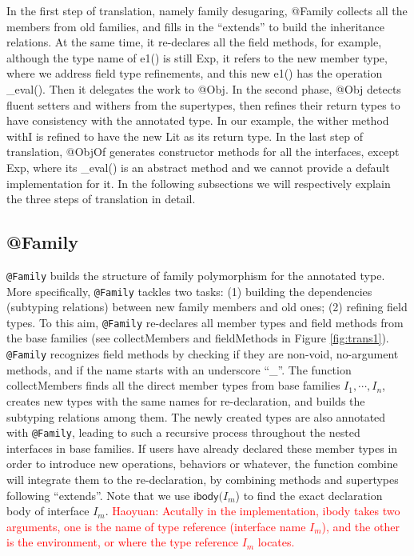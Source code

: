 In the first step of translation, namely family desugaring, \textsf{@Family} collects all the members from old families, and fills in the ``extends'' to build the inheritance relations. At the same time, it re-declares all the field methods, for example, although the type name of \textsf{e1()} is still \textsf{Exp}, it refers to the new member type, where we address field type refinements, and this new \textsf{e1()} has the operation \textsf{\_eval()}. Then it delegates the work to \textsf{@Obj}. In the second phase, \textsf{@Obj} detects fluent setters and withers from the supertypes, then refines their return types to have consistency with the annotated type. In our example, the wither method \textsf{withI} is refined to have the new \textsf{Lit} as its return type. In the last step of translation, \textsf{@ObjOf} generates constructor methods for all the interfaces, except \textsf{Exp}, where its \textsf{\_eval()} is an abstract method and we cannot provide a default implementation for it. In the following subsections we will respectively explain the three steps of translation in detail.

\subsection{\textsf{@Family}}
\lstinline{@Family} builds the structure of family polymorphism for the annotated type. More specifically, \lstinline{@Family} tackles two
tasks: (1) building the dependencies (subtyping relations) between new family members and old ones; (2) refining field types. To this
aim, \lstinline{@Family} re-declares all member types and field methods from the base families (see \textsf{collectMembers} and \textsf{fieldMethods} in Figure \ref{fig:trans1}). \lstinline{@Family} recognizes field methods by checking if they are non-void, no-argument methods, and if the name starts with an underscore ``\_''.  The function \textsf{collectMembers} finds all the direct member types from base families $I_1,\cdots,I_n$, creates new types with the same names for re-declaration, and builds the subtyping relations among them. The newly created types are also annotated with \lstinline{@Family}, leading to such a recursive process throughout the nested interfaces in base families. If users have already declared these member types in order to introduce new operations, behaviors or whatever, the function \textsf{combine} will integrate them to the re-declaration, by combining methods and supertypes following ``extends''. Note that we use $\textsf{ibody(}I_m$\textsf{)} to find the exact declaration body of interface $I_m$. \textcolor{red}{Haoyuan: Acutally in the implementation, \textsf{ibody} takes two arguments, one is the name of type reference (interface name $I_m$), and the other is the environment, or where the type reference $I_m$ locates.}

